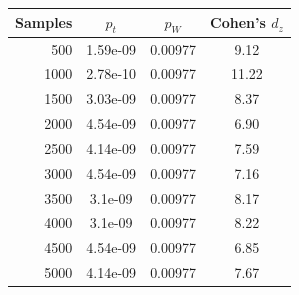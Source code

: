 \begin{tabular}{rccc}
\hline
Samples & $p_t$ & $p_W$ & Cohen's $d_z$ \\
\hline
500 & 1.59e-09 & 0.00977 & 9.12 \\
1000 & 2.78e-10 & 0.00977 & 11.22 \\
1500 & 3.03e-09 & 0.00977 & 8.37 \\
2000 & 4.54e-09 & 0.00977 & 6.90 \\
2500 & 4.14e-09 & 0.00977 & 7.59 \\
3000 & 4.54e-09 & 0.00977 & 7.16 \\
3500 & 3.1e-09 & 0.00977 & 8.17 \\
4000 & 3.1e-09 & 0.00977 & 8.22 \\
4500 & 4.54e-09 & 0.00977 & 6.85 \\
5000 & 4.14e-09 & 0.00977 & 7.67 \\
\hline
\end{tabular}